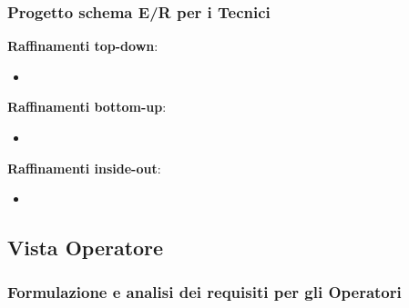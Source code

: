 \documentclass{article}
\begin{document}
\subsubsection{Progetto schema E/R per i Tecnici}
\begin{center}
    
\end{center}
\textbf{Raffinamenti top-down}:
\begin{itemize}
    \item 
\end{itemize}
\textbf{Raffinamenti bottom-up}:
\begin{itemize}
    \item 
\end{itemize}
\textbf{Raffinamenti inside-out}:
\begin{itemize}
    \item 
\end{itemize}

\newpage
\subsection{Vista Operatore}
\subsubsection{Formulazione e analisi dei requisiti per gli Operatori}
\end{document}
